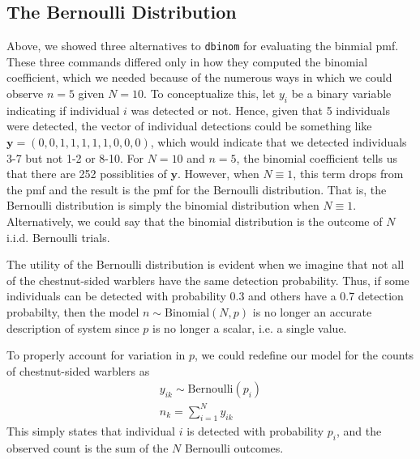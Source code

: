 \subsection{The Bernoulli Distribution}


Above, we showed three alternatives to \verb+dbinom+ for evaluating the
binmial pmf. These three commands differed only in how they computed
the binomial coefficient, which we needed because of the numerous ways
in which we could observe $n=5$ given $N=10$. To conceptualize
this, let $y_i$ be a binary variable indicating if individual $i$
was detected or not. Hence, given that 5 individuals were detected,
the vector of individual detections could be something like
$\mathbf{y}=(0,0,1,1,1,1,1,0,0,0)$, which would indicate
that we detected individuals 3-7 but not 1-2 or 8-10. For $N=10$ and
$n=5$, the binomial coefficient tells us that there
are 252 possiblities of $\mathbf{y}$. However, when $N \equiv 1$, this term
drops from the pmf and the result is the pmf for the Bernoulli
distribution. That is, the Bernoulli distribution is simply the
binomial distribution when $N \equiv 1$. Alternatively, we could say that the binomial
distribution is the outcome of $N$ i.i.d. Bernoulli trials.

The utility of the Bernoulli distribution is evident when we imagine
that not all of the chestnut-sided warblers have the same detection
probability. Thus, if some individuals can be detected with
probability 0.3 and others have a 0.7 detection probabilty, then the
model $n \sim \text{Binomial}(N, p)$ is no longer an accurate
description of system since $p$ is no
longer a scalar, i.e. a single value.


To properly account for variation in $p$, we could redefine our model
for the %
counts of chestnut-sided warblers as
\begin{gather}
y_{ik} \sim \text{Bernoulli}(p_i) \nonumber \\%
n_k = \sum_{i=1}^N y_{ik}
\label{modeling.eq.Bern}
\end{gather}
This simply states that individual $i$ is detected with probability
$p_i$, and the observed count is the sum of the $N$ Bernoulli
outcomes.

